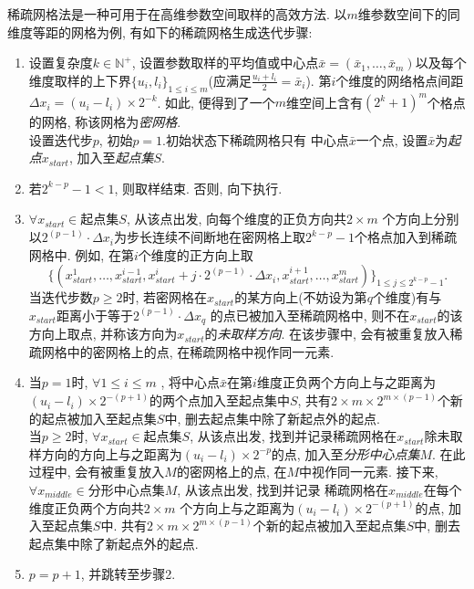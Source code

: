 \documentclass[a4paper,punct=banjiao,twoside]{ctexrep}
\theoremstyle{plain}
\theoremstyle{definition}
\theoremstyle{remark}
\begin{document}
稀疏网格法\cite{15,18}是一种可用于在高维参数空间取样的高效方法. 以$m$维参数空间下的同维度等距的网格为例, 有如下的稀疏网格生成迭代步骤:

\begin{enumerate}
  \item 设置复杂度$k\in \mathbb{N}^+ $, 设置参数取样的平均值或中心点$\bar{x} = (\bar{x}_1 ,\dots, \bar{x}_m)$以及每个维度取样的上下界$\{u_i,l_i\}_{1 \leq i \leq m}$(应满足$\frac{u_i+l_i}{2}=\bar{x}_i$).
  第$i$个维度的网络格点间距$\Delta x_i = (u_i - l_i)\times 2^{-k}$. 如此, 便得到了一个$m$维空间上含有$(2^k+1)^m$个格点的网格, 称该网格为\textit{密网格}.\\
  设置迭代步$p$, 初始$p = 1$.初始状态下稀疏网格只有
  中心点$\bar{x}$一个点, 设置$\bar{x}$为\textit{起点}$x_{start}$, 加入至\textit{起点集}$S$.
  \item 若$2^{k-p}-1 < 1$, 则取样结束. 否则, 向下执行.
  \item $\forall x_{start} \in \textit{起点集}S$, 从该点出发, 向每个维度的正负方向共$2\times m$ 个方向上分别以$2^{(p-1)} \cdot \Delta x_i$为步长连续不间断地在密网格上取$2^{k-p}-1$个格点加入到稀疏网格中.
  例如, 在第$i$个维度的正方向上取
  $$
  \{( x_{start}^1,\dots,x_{start}^{i-1},x_{start}^i+j\cdot 2^{(p-1)} \cdot  \Delta x_i, x_{start}^{i+1},\dots,x_{start}^m)\}_{1 \leq j \leq 2^{k-p}-1}.
  $$
  当迭代步数$p \geq 2$时, 若密网格在$x_{start}$的某方向上(不妨设为第$q$个维度)有与$x_{start}$距离小于等于$2^{(p-1)} \cdot \Delta x_q$
  的点已被加入至稀疏网格中, 则不在$x_{start}$的该方向上取点, 并称该方向为$x_{start}$的\textit{未取样方向}. 在该步骤中, 会有被重复放入稀疏网格中的密网格上的点, 在稀疏网格中视作同一元素.
  
  \item 
  当$p = 1$时, $\forall 1 \leq i \leq m$ , 将中心点$\bar{x}$在第$i$维度正负两个方向上与之距离为$(u_i - l_i)\times 2^{-(p+1)}$的两个点加入至起点集中$S$, 共有$2\times m\times 2^{m\times (p-1)}$个新的起点被加入至起点集$S$中, 删去起点集中除了新起点外的起点.\\
  当$p \geq 2$时, $\forall x_{start} \in \textit{起点集}S$, 从该点出发, 找到并记录稀疏网格在$x_{start}$除未取样方向的方向上与之距离为$(u_i - l_i)\times 2^{-p}$的点, 加入至\textit{分形中心点集}$M$.
  在此过程中, 会有被重复放入$M$的密网格上的点, 在$M$中视作同一元素. 接下来, $\forall x_{middle} \in \textit{分形中心点集}M$, 从该点出发, 找到并记录
  稀疏网格在$x_{middle}$在每个维度正负两个方向共$2\times m$ 个方向上与之距离为$(u_i - l_i)\times 2^{-(p+1)}$的点, 加入至起点集$S$中.
  共有$2\times m\times 2^{m\times (p-1)}$个新的起点被加入至起点集$S$中, 删去起点集中除了新起点外的起点. 

  \item $p = p + 1$, 并跳转至步骤2.
  \end{enumerate}
\end{document}
